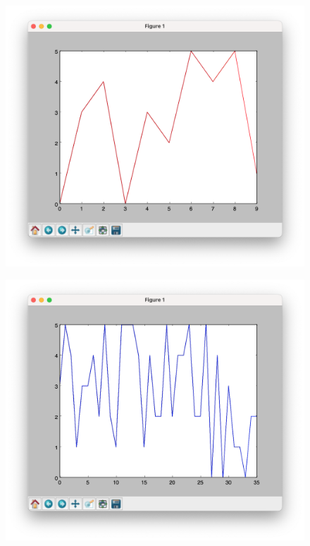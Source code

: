 \documentclass[11pt, a4paper]{article}
\begin{document}
\begin{figure}
    \centering
    \begin{minipage}{.5\textwidth}
      \centering
      \includegraphics[width=\linewidth]{p_fa_1.png}
      \label{fig:test1}
    \end{minipage}%
    \begin{minipage}{.5\textwidth}
      \centering
      \includegraphics[width=\linewidth]{p_fa_2.png}
      \label{fig:test2}
    \end{minipage}
\end{figure}
\end{document}
